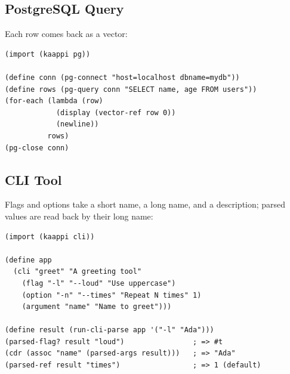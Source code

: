 \subsection{PostgreSQL Query}

Each row comes back as a vector:

\begin{lstlisting}
(import (kaappi pg))

(define conn (pg-connect "host=localhost dbname=mydb"))
(define rows (pg-query conn "SELECT name, age FROM users"))
(for-each (lambda (row)
            (display (vector-ref row 0))
            (newline))
          rows)
(pg-close conn)
\end{lstlisting}

\subsection{CLI Tool}

Flags and options take a short name, a long name, and a description; parsed values are read back by their long name:

\begin{lstlisting}
(import (kaappi cli))

(define app
  (cli "greet" "A greeting tool"
    (flag "-l" "--loud" "Use uppercase")
    (option "-n" "--times" "Repeat N times" 1)
    (argument "name" "Name to greet")))

(define result (run-cli-parse app '("-l" "Ada")))
(parsed-flag? result "loud")                ; => #t
(cdr (assoc "name" (parsed-args result)))   ; => "Ada"
(parsed-ref result "times")                 ; => 1 (default)
\end{lstlisting}
